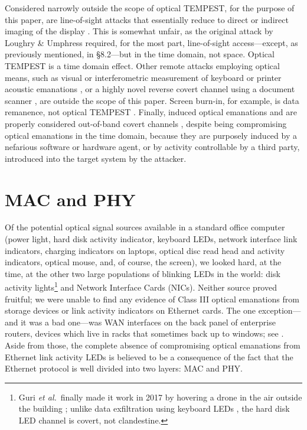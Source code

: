 \documentclass[conference]{IEEEtran}
\begin{document}
Considered narrowly outside the scope of optical TEMPEST, for the purpose of
this paper, are line-of-sight attacks that essentially reduce to direct or
indirect imaging of the display
\cite{Backes2008,Balzarotti2008,Backes2009a,Raguram2011,Xu2013a,Jenkins2013a}.
This is somewhat unfair, as the original attack by Loughry \& Umphress
required, for the most part, line-of-sight access---except, as previously
mentioned, in \S 8.2---but in the time domain, not space. Optical TEMPEST is
a time domain effect. Other remote attacks employing optical means, such as
visual or interferometric measurement of keyboard or printer acoustic
emanations \cite{Asonov2004,Zhuang2005,Berger2006,Backes2010}, or a highly
novel reverse covert channel using a document scanner \cite{Nassi2017a}, are
outside the scope of this paper. Screen burn-in, for example, is data
remanence, not optical TEMPEST \cite{MDH1998a}. Finally, induced optical
emanations
\cite{Sepetnitsky2014a,Guri2016b,Guri2017a,Guri2017b,Lopes2017a,Guri2017c,
Zhou2017,Zhou2018a} and \cite[Appendix A]{Loughry2002a} are properly
considered out-of-band covert channels
\cite{Lampson1973,Hanspach2014,Carrara2016}, despite being compromising
optical emanations in the time domain, because they are purposely induced by
a nefarious software or hardware agent, or by activity controllable by a
third party, introduced into the target system by the attacker.

\section{MAC and PHY}

Of the potential optical signal sources available in a standard office
computer (power light, hard disk activity indicator, keyboard LEDs, network
interface link indicators, charging indicators on laptops, optical disc read
head and activity indicators, optical mouse, and, of course, the screen), we
looked hard, at the time, at the other two large populations of blinking
LEDs in the world: disk activity lights\footnote{Guri {\it et al.}\ finally
made it work in 2017 by hovering a drone in the air outside the building
\cite{Guri2017a}; unlike data exfiltration using keyboard LEDs
\cite[Chapter 90]{Stephenson1999}, the hard disk LED channel is covert, not
clandestine.} and Network Interface Cards (NICs).
Neither source proved fruitful; we were unable to find any evidence of Class
III optical emanations from storage devices or link activity indicators on
Ethernet cards. The one exception---and it was a bad one---was WAN interfaces
on the back panel of enterprise routers, devices which live in racks that
sometimes back up to windows; see \cite[\S 4.3.1]{Loughry2002a}. Aside from
those, the complete absence of compromising optical emanations from Ethernet
link activity LEDs is believed to be a consequence of the fact that the
Ethernet protocol is well divided into two layers: MAC and PHY.
\end{document}
